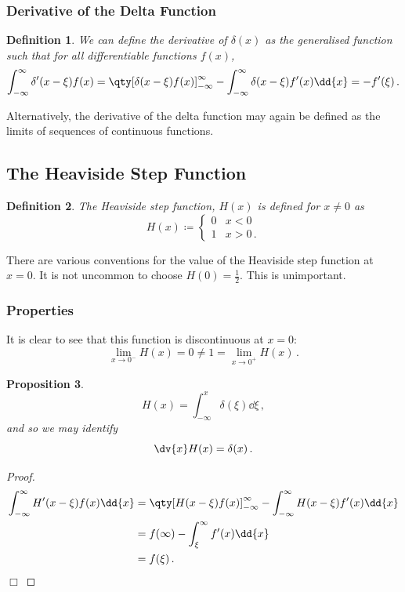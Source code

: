 \documentclass{article}
\theoremstyle{plain}\theoremheaderfont{\normalfont\itshape}\theorembodyfont{\rmfamily}\theoremseparator{.}\newtheorem*{rem}{Remark}\newtheorem*{ex}{Example}\newtheorem*{proof}{Proof}\newtheorem*{altp}{Alternative proof}
\theoremstyle{plain}\theoremheaderfont{\normalfont\bfseries}\theorembodyfont{\rmfamily}\theoremseparator{.}\newtheorem{thm}{Theorem}[section]\newtheorem{lem}[thm]{Lemma}\newtheorem{prop}[thm]{Proposition}\newtheorem*{cor}{Corollary}\newtheorem{defn}[thm]{Definition}\newtheorem{clm}[thm]{Claim}\newtheorem{clminproof}{Claim}
\theoremstyle{break}\theoremheaderfont{\normalfont\itshape}\theorembodyfont{\rmfamily}\theoremseparator{.\medskip}\newtheorem*{proofskip}{Proof}\newtheorem*{exs}{Examples}\newtheorem*{rems}{Remarks}
\theoremstyle{break}\theoremheaderfont{\normalfont\bfseries}\theorembodyfont{\rmfamily}\theoremseparator{.\medskip}\newtheorem{lemskip}[thm]{Lemma}\newtheorem{defnskip}[thm]{Definition}\newtheorem{propskip}[thm]{Proposition}\newtheorem{thmskip}[thm]{Theorem}
\numberwithin{equation}{section}
\newcommand{\qed}{\hfill\ensuremath{\Box}}
\begin{document}
	\subsubsection{Derivative of the Delta Function}
	\begin{defn}
		We can define the derivative of \(\delta(x)\) as the generalised function such that for all differentiable functions \(f(x)\),
		\[\int_{-\infty}^{\infty}\delta'(x-\xi)f(x)=\qty[\delta(x-\xi)f(x)]^{\infty}_{-\infty}-\int_{-\infty}^{\infty}\delta(x-\xi)f'(x)\dd{x}=-f'(\xi)\,.\]
	\end{defn}
	
	Alternatively, the derivative of the delta function may again be defined as the limits of sequences of continuous functions.
	\subsection{The Heaviside Step Function}
	\begin{defn}
		The \textit{Heaviside step function}, \(H(x)\) is defined for \(x\ne 0\) as
		\[H(x)\coloneqq\begin{cases}
			0 & x<0\\
			1 & x>0\,.
		\end{cases}\]
	\end{defn}
	There are various conventions for the value of the Heaviside step function at \(x=0\). It is not uncommon to choose \(H(0)=\frac{1}{2}\). This is unimportant.
	
	\subsubsection{Properties}
	It is clear to see that this function is discontinuous at \(x=0\):
	\[\lim_{x\to 0^-}H(x)=0\ne1=\lim_{x\to 0^+}H(x)\,.\]
	
	\begin{prop}
		\[H(x)=\int_{-\infty}^{x}\delta(\xi)\dd{\xi}\,,\]
		and so we may identify
		\[\dv{x} H(x)=\delta(x)\,.\]
	\end{prop}

	\begin{proof}
		\begin{align*}
			\int_{-\infty}^{\infty}H'(x-\xi)f(x)\dd{x}&=\qty[H(x-\xi)f(x)]^{\infty}_{-\infty}-\int_{-\infty}^{\infty}H(x-\xi)f'(x)\dd{x}\\
			&=f(\infty)-\int_{\xi}^{\infty}f'(x)\dd{x}\\
			&=f(\xi)\,.
		\end{align*}\qed
	\end{proof}
\end{document}
